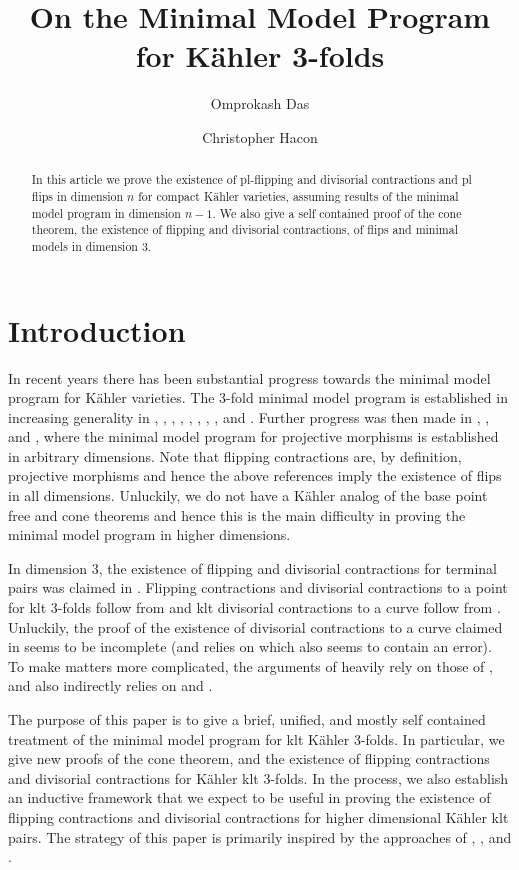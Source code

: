 \documentclass[12pt]{amsart}
\title{On the Minimal Model Program for K\"ahler 3-folds}
\author{Omprokash Das}
\author{Christopher Hacon}
\date{}
\theoremstyle{plain}
\theoremstyle{remark}
\theoremstyle{definition}
\newcommand{\<}{\leq}
\theoremstyle{definition}
\theoremstyle{definition}
\numberwithin{equation}{section}
\theoremstyle{remark}
\begin{document}
\maketitle

\begin{abstract}
    In this article we prove the existence of pl-flipping and divisorial contractions and pl flips in dimension $n$ for compact K\"ahler varieties, assuming results of the minimal model program in dimension $n-1$. We also give a self contained proof of the cone theorem, the existence of flipping and divisorial contractions, of flips and minimal models in dimension 3.
\end{abstract}

\tableofcontents

\section{Introduction}
In recent years there has been substantial progress towards the minimal model program for K\"ahler varieties.
The 3-fold minimal model program is established in increasing generality in \cite{CP97}, \cite{HP15}, \cite{Pet98}, \cite{Pet01}, \cite{HP16}, \cite{CHP16}, \cite{DH20}, \cite{DO23}, and \cite{DHY23}.
Further progress was then made in \cite{Fuj22}, \cite{DHP22}, and \cite{LM22}, where the minimal model program for projective morphisms is established in arbitrary dimensions. Note that flipping contractions are, by definition, projective morphisms and hence the above references imply the existence of flips in all dimensions. Unluckily, we do not have a K\"ahler analog of the base point free and cone theorems and hence this is the main difficulty in proving the minimal model program in higher dimensions. 

In dimension 3, the existence of flipping and divisorial contractions for terminal pairs was claimed in \cite{HP16}. Flipping contractions and divisorial contractions to a point for klt 3-folds follow from \cite{CHP16} and klt divisorial contractions to a curve follow from \cite{DH20}.
Unluckily, the proof of the existence of divisorial contractions to a curve  claimed in \cite{HP16} seems to be incomplete (and relies on \cite{AT84} which also seems to contain an error). To make matters more complicated, the arguments of \cite{CHP16} heavily rely on those of \cite{HP16}, and \cite{DH20} also indirectly relies on  \cite{HP16} and \cite{CHP16}.

 The purpose of this paper is to give a brief, unified, and mostly self contained treatment of the minimal model program for klt K\"ahler 3-folds. In particular, we give new proofs of the cone theorem, and the existence of flipping contractions and divisorial contractions for K\"ahler klt 3-folds.  In the process, we also establish an inductive framework that we expect to be useful in proving the existence of flipping contractions and divisorial contractions for higher dimensional K\"ahler klt pairs. The strategy of this paper is primarily inspired by the approaches of \cite{BCHM10}, \cite{DH20}, and \cite{DHP22}. %
\end{document}
